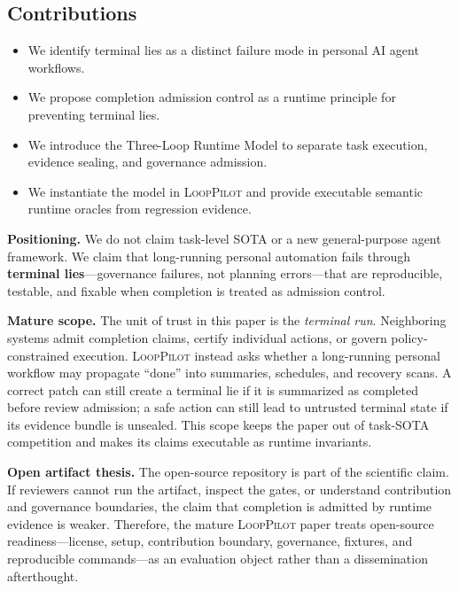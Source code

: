 \documentclass[11pt]{article}
\newcommand{\looppilot}{\textsc{LoopPilot}}
\begin{document}
\subsection{Contributions}
\begin{itemize}[leftmargin=*]
  \item[\textbf{C1}] We identify terminal lies as a distinct failure mode in personal AI agent workflows.
  \item[\textbf{C2}] We propose completion admission control as a runtime principle for preventing terminal lies.
  \item[\textbf{C3}] We introduce the Three-Loop Runtime Model to separate task execution, evidence sealing, and governance admission.
  \item[\textbf{C4}] We instantiate the model in \looppilot{} and provide executable semantic runtime oracles from regression evidence.
\end{itemize}

\textbf{Positioning.} We do not claim task-level SOTA or a new general-purpose agent framework.
We claim that long-running personal automation fails through \textbf{terminal lies}---governance failures, not planning errors---that are reproducible, testable, and fixable when completion is treated as admission control.

\textbf{Mature scope.} The unit of trust in this paper is the \emph{terminal run}.
Neighboring systems admit completion claims, certify individual actions, or govern policy-constrained execution.
\looppilot{} instead asks whether a long-running personal workflow may propagate ``done'' into summaries, schedules, and recovery scans.
A correct patch can still create a terminal lie if it is summarized as completed before review admission; a safe action can still lead to untrusted terminal state if its evidence bundle is unsealed.
This scope keeps the paper out of task-SOTA competition and makes its claims executable as runtime invariants.

\textbf{Open artifact thesis.} The open-source repository is part of the scientific claim.
If reviewers cannot run the artifact, inspect the gates, or understand contribution and governance boundaries, the claim that completion is admitted by runtime evidence is weaker.
Therefore, the mature \looppilot{} paper treats open-source readiness---license, setup, contribution boundary, governance, fixtures, and reproducible commands---as an evaluation object rather than a dissemination afterthought.
\end{document}
